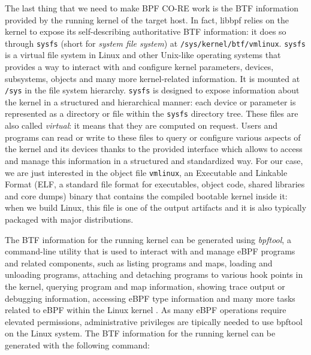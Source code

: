 The last thing that we need to make BPF CO-RE work is the BTF information provided by the running kernel of the target host.
In fact, libbpf relies on the kernel to expose its self-describing authoritative BTF information: it does so through \colorbox{backcolour}{\lstinline[style=highlight, language=bash]|sysfs|} (short for \textit{system file system}) at \colorbox{backcolour}{\lstinline[style=highlight, language=bash]|/sys/kernel/btf/vmlinux|}.
\colorbox{backcolour}{\lstinline[style=highlight, language=bash]|sysfs|} is a virtual file system in Linux and other Unix-like operating systems that provides a way to interact with and configure kernel parameters, devices, subsystems, objects and many more kernel-related information. 
It is mounted at \colorbox{backcolour}{\lstinline[style=highlight, language=bash]|/sys|} in the file system hierarchy.
\colorbox{backcolour}{\lstinline[style=highlight, language=bash]|sysfs|} is designed to expose information about the kernel in a structured and hierarchical manner: each device or parameter is represented as a directory or file within the \colorbox{backcolour}{\lstinline[style=highlight, language=bash]|sysfs|} directory tree. 
These files are also called \textit{virtual}: it means that they are computed on request.
Users and programs can read or write to these files to query or configure various aspects of the kernel and its devices thanks to the provided interface which allows to access and manage this information in a structured and standardized way.
For our case, we are just interested in the object file \colorbox{backcolour}{\lstinline[style=highlight, language=bash]|vmlinux|}, an Executable and Linkable Format (ELF, a standard file format for executables, object code, shared libraries and core dumps) binary that contains the compiled bootable kernel inside it: when we build Linux, this file is one of the output artifacts and it is also typically packaged with major distributions. 

The BTF information for the running kernel can be generated using \textit{bpftool}, a command-line utility that is used to interact with and manage eBPF programs and related components, such as listing programs and maps, loading and unloading programs, attaching and detaching programs to various hook points in the kernel, querying program and map information, showing trace output or debugging information, accessing eBPF type information and many more tasks related to eBPF within the Linux kernel \cite{bpftoolGitHubRepo}.
As many eBPF operations require elevated permissions, administrative privileges are tipically needed to use bpftool on the Linux system.
The BTF information for the running kernel can be generated with the following command:

